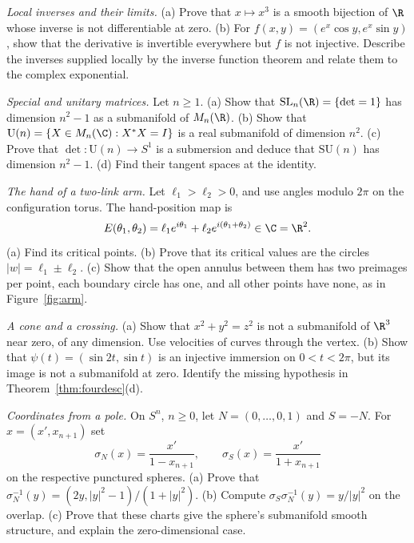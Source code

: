 \begin{exercise}[$\star$]\label{ex:cubeinverse}
\emph{Local inverses and their limits.} (a) Prove that $x\mapsto x^3$ is a smooth bijection of $\R$ whose inverse is not differentiable at zero. (b) For $f(x,y)=(e^x\cos y,e^x\sin y)$, show that the derivative is invertible everywhere but $f$ is not injective. Describe the inverses supplied locally by the inverse function theorem and relate them to the complex exponential.
\end{exercise}
\begin{exercise}[$\star$]\label{ex:matrixgroups}
\emph{Special and unitary matrices.} Let $n\ge1$. (a) Show that $\mathrm{SL}_n(\R)=\{\det=1\}$ has dimension $n^2-1$ as a submanifold of $M_n(\R)$. (b) Show that $\mathrm U(n)=\{X\in M_n(\C):X^*X=I\}$ is a real submanifold of dimension $n^2$. (c) Prove that $\det:\mathrm U(n)\to S^1$ is a submersion and deduce that $\mathrm{SU}(n)$ has dimension $n^2-1$. (d) Find their tangent spaces at the identity.
\end{exercise}
\begin{exercise}[$\star$]\label{ex:twolinkarm}
\emph{The hand of a two-link arm.} Let $\ell_1>\ell_2>0$, and use angles modulo $2\pi$ on the configuration torus. The hand-position map is
\[
E(\theta_1,\theta_2)=\ell_1e^{i\theta_1}+\ell_2e^{i(\theta_1+\theta_2)}\in\C=\R^2.
\]
(a) Find its critical points. (b) Prove that its critical values are the circles $|w|=\ell_1\pm\ell_2$. (c) Show that the open annulus between them has two preimages per point, each boundary circle has one, and all other points have none, as in Figure~\ref{fig:arm}.
\end{exercise}
\begin{exercise}[$\star$]\label{ex:nosubmanifold}
\emph{A cone and a crossing.} (a) Show that $x^2+y^2=z^2$ is not a submanifold of $\R^3$ near zero, of any dimension. Use velocities of curves through the vertex. (b) Show that $\psi(t)=(\sin2t,\sin t)$ is an injective immersion on $0<t<2\pi$, but its image is not a submanifold at zero. Identify the missing hypothesis in Theorem~\ref{thm:fourdesc}(d).
\end{exercise}
\begin{exercise}[$\star$]\label{ex:stereographic}
\emph{Coordinates from a pole.} On $S^n$, $n\ge0$, let $N=(0,\ldots,0,1)$ and $S=-N$. For $x=(x',x_{n+1})$ set
\[
\sigma_N(x)=\frac{x'}{1-x_{n+1}},\qquad
\sigma_S(x)=\frac{x'}{1+x_{n+1}}
\]
on the respective punctured spheres. (a) Prove that $\sigma_N^{-1}(y)=(2y,|y|^2-1)/(1+|y|^2)$. (b) Compute $\sigma_S\sigma_N^{-1}(y)=y/|y|^2$ on the overlap. (c) Prove that these charts give the sphere's submanifold smooth structure, and explain the zero-dimensional case.
\end{exercise}
